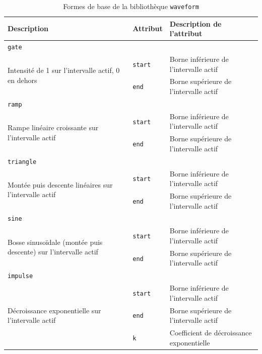 \begin{table}[h]
\centering
\begin{tabular}{p{6cm} l p{6.2cm} }
\hline
\textbf{Description} & \textbf{Attribut} & \textbf{Description de l'attribut} \\
\hline

\multicolumn{3}{l}{\texttt{gate}} \\
\hline
\multirow{2}{6cm}{Intensité de 1 sur l'intervalle actif, 0 en dehors} &
\texttt{start} & Borne inférieure de l'intervalle actif \\
\cline{2-3}
 & \texttt{end} & Borne supérieure de l'intervalle actif \\
\hline

\multicolumn{3}{l}{\texttt{ramp}} \\
\hline
\multirow{2}{6cm}{Rampe linéaire croissante sur l'intervalle actif} &
\texttt{start} & Borne inférieure de l'intervalle actif \\
\cline{2-3}
 & \texttt{end} & Borne supérieure de l'intervalle actif \\
\hline

\multicolumn{3}{l}{\texttt{triangle}} \\
\hline
\multirow{2}{6cm}{Montée puis descente linéaires sur l'intervalle actif} &
\texttt{start} & Borne inférieure de l'intervalle actif \\
\cline{2-3}
 & \texttt{end} & Borne supérieure de l'intervalle actif \\
\hline

\multicolumn{3}{l}{\texttt{sine}} \\
\hline
\multirow{2}{6cm}{Bosse sinusoïdale (montée puis descente) sur l'intervalle actif} &
\texttt{start} & Borne inférieure de l'intervalle actif \\
\cline{2-3}
 & \texttt{end} & Borne supérieure de l'intervalle actif \\
\hline

\multicolumn{3}{l}{\texttt{impulse}} \\
\hline
\multirow{3}{6cm}{Décroissance exponentielle sur l'intervalle actif} &
\texttt{start} & Borne inférieure de l'intervalle actif \\
\cline{2-3}
 & \texttt{end} & Borne supérieure de l'intervalle actif \\
\cline{2-3}
 & \texttt{k} & Coefficient de décroissance exponentielle \\
\hline

\end{tabular}
\caption{Formes de base de la bibliothèque \texttt{waveform}}
\label{tab:formes_base}
\end{table}


